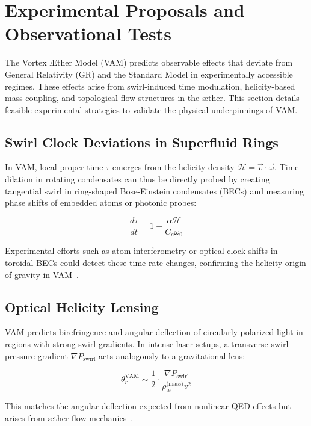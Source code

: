 \documentclass[preprint]{revtex4-2}
\begin{document}
\section{Experimental Proposals and Observational Tests}
    The Vortex \AE{}ther Model (VAM) predicts observable effects that deviate from General Relativity (GR) and the Standard Model in experimentally accessible regimes. These effects arise from swirl-induced time modulation, helicity-based mass coupling, and topological flow structures in the æther. This section details feasible experimental strategies to validate the physical underpinnings of VAM.

    \subsection{Swirl Clock Deviations in Superfluid Rings}
    In VAM, local proper time $\tau$ emerges from the helicity density \( \mathcal{H} = \vec{v} \cdot \vec{\omega} \). Time dilation in rotating condensates can thus be directly probed by creating tangential swirl in ring-shaped Bose-Einstein condensates (BECs) and measuring phase shifts of embedded atoms or photonic probes:

    \begin{equation}
        \frac{d\tau}{dt} = 1 - \frac{\alpha \mathcal{H}}{C_e \omega_0}
    \end{equation}

    Experimental efforts such as atom interferometry or optical clock shifts in toroidal BECs could detect these time rate changes, confirming the helicity origin of gravity in VAM~\cite{pethick2008bose, kleckner2013creation, scheeler2014helicity}.

    \subsection{Optical Helicity Lensing}
    VAM predicts birefringence and angular deflection of circularly polarized light in regions with strong swirl gradients. In intense laser setups, a transverse swirl pressure gradient $ \nabla P_{\text{swirl}} $ acts analogously to a gravitational lens:

    \begin{equation}
        \theta_r^{\text{VAM}} \sim \frac{1}{2} \cdot \frac{\nabla P_{\text{swirl}}}{\rho_{\text{\ae}}^{\text{(mass)}} v^2}
    \end{equation}

    This matches the angular deflection expected from nonlinear QED effects but arises from æther flow mechanics~\cite{sarazin2016refraction, battesti2013qed, zhang2025simulation}.
\end{document}
